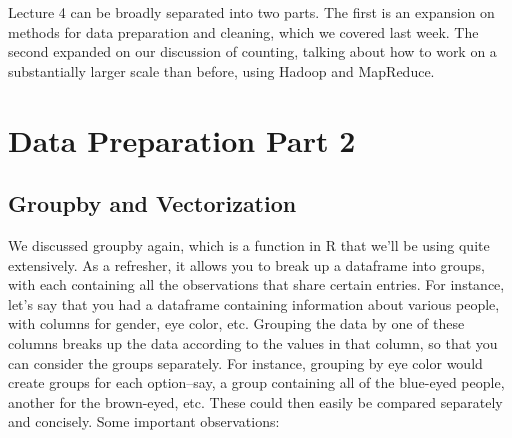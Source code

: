 Lecture 4 can be broadly separated into two parts. The first is an expansion on methods for data preparation and cleaning, which we covered last week. The second expanded on our discussion of counting, talking about how to work on a substantially larger scale than before, using Hadoop and MapReduce.\\
\section{Data Preparation Part 2}
\subsection{Groupby and Vectorization}
We discussed groupby again, which is a function in R that we'll be using quite extensively. As a refresher, it allows you to break up a dataframe into groups, with each containing all the observations that share certain entries. For instance, let's say that you had a dataframe containing information about various people, with columns for gender, eye color, etc. Grouping the data by one of these columns breaks up the data according to the values in that column, so that you can consider the groups separately. For instance, grouping by eye color would create groups for each option--say, a group containing all of the blue-eyed people, another for the brown-eyed, etc. These could then easily be compared separately and concisely. Some important observations:\\
